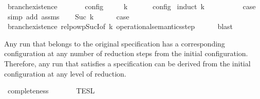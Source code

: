 \begin{isabellebody}
%
\endisadelimproof
\isanewline
{}\isamarkupfalse%
\ branch{\isacharunderscore}existence{\isacharprime}{\isacharcolon}\isanewline
\ \ \ {\isacartoucheopen}{\isasymrho}\ {\isasymin}\ {\isasymlbrakk}\ {\isasymS}\ {\isasymrbrakk}\isactrlsub c\isactrlsub o\isactrlsub n\isactrlsub f\isactrlsub i\isactrlsub g{\isacartoucheclose}\isanewline
\ \ \ {\isacartoucheopen}{\isasymexists}{\isasymS}\ {\isacharparenleft}{\isasymS}\ {\isasymhookrightarrow}\isactrlbsup k\isactrlesup \ {\isasymS}\ {\isasymand}\ {\isacharparenleft}{\isasymrho}\ {\isasymin}\ {\isasymlbrakk}\ {\isasymS}\ {\isasymrbrakk}\isactrlsub c\isactrlsub o\isactrlsub n\isactrlsub f\isactrlsub i\isactrlsub g{\isacharparenright}{\isacartoucheclose}\isanewline
%
\isadelimproof
%
\endisadelimproof
%
\isatagproof
{}\isamarkupfalse%
\ {\isacharparenleft}induct\ k{\isacharparenright}\isanewline
\ \ \isamarkupfalse%
\ {}\isanewline
\ \ \ \ \isamarkupfalse%
\ {\isacharquery}case\ \isamarkupfalse%
\ {\isacharparenleft}simp\ add{\isacharcolon}\ assms{\isacharparenright}\isanewline
{}\isamarkupfalse%
\isanewline
\ \ \isamarkupfalse%
\ {\isacharparenleft}Suc\ k{\isacharparenright}\isanewline
\ \ \ \ \isamarkupfalse%
\ {\isacharquery}case\isanewline
\ \ \ \ \ \ \isamarkupfalse%
\ branch{\isacharunderscore}existence\ relpowp{\isacharunderscore}Suc{\isacharunderscore}I{\isacharbrackleft}of\ {\isacartoucheopen}k{\isacartoucheclose}\ {\isacartoucheopen}operational{\isacharunderscore}semantics{\isacharunderscore}step{\isacartoucheclose}{\isacharbrackright}\isanewline
\ \ \ \ \isamarkupfalse%
\ blast\isanewline
{}\isamarkupfalse%
%
\endisatagproof
{\isafoldproof}%
%
\isadelimproof
%
\endisadelimproof
%
\begin{isamarkuptext}%
Any run that belongs to the original specification \isa{{\isasymPsi}} has a corresponding 
  configuration \isa{{\isasymS}} at any number  of reduction steps
  from the initial configuration. Therefore, any run that satisfies a specification
  can be derived from the initial configuration at any level of reduction.%
\end{isamarkuptext}\isamarkuptrue%
\isamarkupfalse%
\ completeness{\isacharcolon}\isanewline
\ \ \ {\isacartoucheopen}{\isasymrho}\ {\isasymin}\ {\isasymlbrakk}{\isasymlbrakk}\ {\isasymPsi}\ {\isasymrbrakk}{\isasymrbrakk}\isactrlsub T\isactrlsub E\isactrlsub S\isactrlsub L{\isacartoucheclose}\isanewline

\end{isabellebody}
